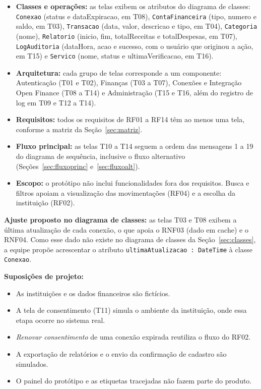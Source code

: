 \documentclass[11pt,a4paper]{article}
\newcommand{\cls}[1]{\texttt{#1}}
\begin{document}
\begin{itemize}
\item \textbf{Classes e operações:} as telas exibem os atributos do diagrama de classes: \cls{Conexao} (status e dataExpiracao, em T08), \cls{ContaFinanceira} (tipo, numero e saldo, em T03), \cls{Transacao} (data, valor, descricao e tipo, em T04), \cls{Categoria} (nome), \cls{Relatorio} (inicio, fim, totalReceitas e totalDespesas, em T07), \cls{LogAuditoria} (dataHora, acao e sucesso, com o usuário que originou a ação, em T15) e \cls{Servico} (nome, status e ultimaVerificacao, em T16).
\item \textbf{Arquitetura:} cada grupo de telas corresponde a um componente: Autenticação (T01 e T02), Finanças (T03 a T07), Conexões e Integração Open Finance (T08 a T14) e Administração (T15 e T16, além do registro de log em T09 e T12 a T14).
\item \textbf{Requisitos:} todos os requisitos de RF01 a RF14 têm ao menos uma tela, conforme a matriz da Seção~\ref{sec:matriz}.
\item \textbf{Fluxo principal:} as telas T10 a T14 seguem a ordem das mensagens 1 a 19 do diagrama de sequência, inclusive o fluxo alternativo (Seções~\ref{sec:fluxoprinc} e~\ref{sec:fluxoalt}).
\item \textbf{Escopo:} o protótipo não inclui funcionalidades fora dos requisitos. Busca e filtros apoiam a visualização das movimentações (RF04) e a escolha da instituição (RF02).
\end{itemize}

\textbf{Ajuste proposto no diagrama de classes:} as telas T03 e T08 exibem a última atualização de cada conexão, o que apoia o RNF03 (dado em cache) e o RNF04. Como esse dado não existe no diagrama de classes da Seção~\ref{sec:classes}, a equipe propõe acrescentar o atributo \cls{ultimaAtualizacao : DateTime} à classe \cls{Conexao}.

\textbf{Suposições de projeto:}
\begin{itemize}
\item As instituições e os dados financeiros são fictícios.
\item A tela de consentimento (T11) simula o ambiente da instituição, onde essa etapa ocorre no sistema real.
\item \emph{Renovar consentimento} de uma conexão expirada reutiliza o fluxo do RF02.
\item A exportação de relatórios e o envio da confirmação de cadastro são simulados.
\item O painel do protótipo e as etiquetas tracejadas não fazem parte do produto.
\end{itemize}
\end{document}
